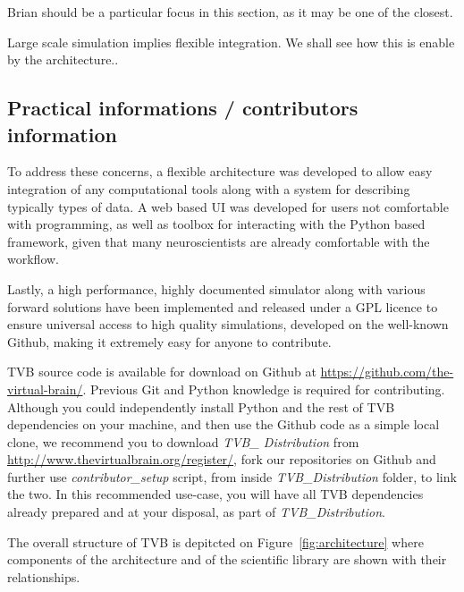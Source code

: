 
	Brian should be a particular focus in this section, as it may
    be one of the closest.  

Large scale simulation implies flexible integration. We shall see
how this is enable by the architecture..

\subsection{Practical informations / contributors information}

To address these concerns, a flexible architecture was developed to
allow easy integration of any computational tools along with a system
for describing typically types of data. A web based UI was developed
for users not comfortable with programming, as well as \matlab{} toolbox
for interacting with the Python based framework, given that many
neuroscientists are already comfortable with the \matlab{} workflow.

Lastly, a high performance, highly documented simulator along with
various forward solutions have been implemented and released under a
GPL licence to ensure universal access to high quality simulations, 
developed on the well-known Github, making it extremely easy for 
anyone to contribute.

TVB source code is available for download on Github at
\url{https://github.com/the-virtual-brain/}.  Previous Git and Python knowledge
is required for contributing.  Although you could independently install Python
and the rest of TVB dependencies on your machine, and then use the Github code
as a simple local clone, we recommend you to download \emph{TVB\_ Distribution}
from \url{http://www.thevirtualbrain.org/register/}, fork our repositories on
Github and further use \emph{contributor\_setup} script, from inside \emph{TVB\_Distribution} 
folder, to link the two.  In this recommended use-case, you will
have all TVB dependencies already prepared and at your disposal, as part of
\emph{TVB\_Distribution}. 


The overall structure of TVB is depitcted on Figure~\ref{fig:architecture} where
components of the architecture and of the scientific library are shown with
their relationships.

